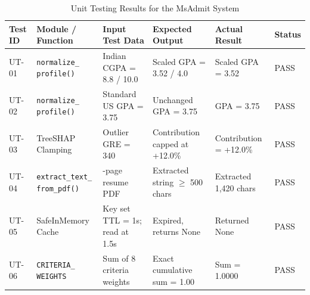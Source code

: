 \begingroup
\small
\setlength{\tabcolsep}{4pt}
\renewcommand{\arraystretch}{1.4}



\begin{table}[htbp]
\centering
\caption{Unit Testing Results for the MsAdmit System}
\label{tab:unit-testing}

\normalsize
\renewcommand{\arraystretch}{1.7}
\setlength{\tabcolsep}{6pt}

\begin{tabularx}{\textwidth}{
|>{\centering\arraybackslash}p{1.0cm}
|>{\raggedright\arraybackslash}X
|>{\raggedright\arraybackslash}X
|>{\raggedright\arraybackslash}X
|>{\raggedright\arraybackslash}X
|>{\centering\arraybackslash}p{1.2cm}|}
\hline
\textbf{Test ID} &
\textbf{Module / Function} &
\textbf{Input Test Data} &
\textbf{Expected Output} &
\textbf{Actual Result} &
\textbf{Status} \\
\hline

UT-01 &
\makecell[l]{\texttt{normalize\_}\\\texttt{profile()}} &
Indian CGPA = 8.8 / 10.0 &
Scaled GPA = 3.52 / 4.0 &
Scaled GPA = 3.52 &
PASS \\
\hline

UT-02 &
\makecell[l]{\texttt{normalize\_}\\\texttt{profile()}} &
Standard US GPA = 3.75 &
Unchanged GPA = 3.75 &
GPA = 3.75 &
PASS \\
\hline

UT-03 &
TreeSHAP Clamping &
Outlier GRE = 340 &
Contribution capped at +12.0\% &
Contribution = +12.0\% &
PASS \\
\hline

UT-04 &
\makecell[l]{\texttt{extract\_text\_}\\\texttt{from\_pdf()}} &
2-page resume PDF &
Extracted string $\geq$ 500 chars &
Extracted 1,420 chars &
PASS \\
\hline

UT-05 &
\makecell[l]{SafeInMemory\\Cache} &
Key set TTL = 1s; read at 1.5s &
Expired, returns None &
Returned None &
PASS \\
\hline

UT-06 &
\makecell[l]{\texttt{CRITERIA\_}\\\texttt{WEIGHTS}} &
Sum of 8 criteria weights &
Exact cumulative sum = 1.00 &
Sum = 1.0000 &
PASS \\
\hline

\end{tabularx}
\end{table}



